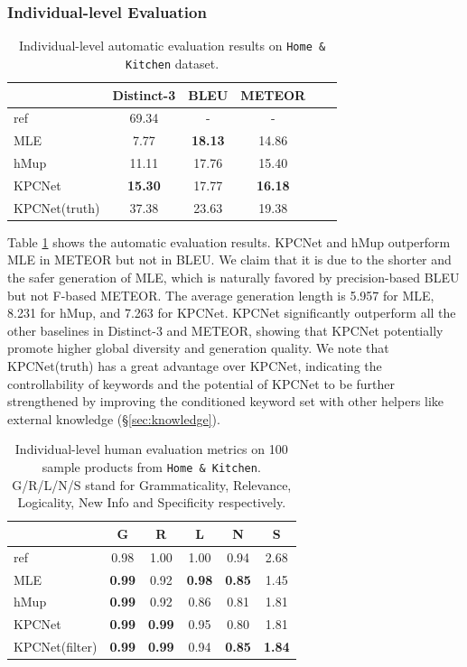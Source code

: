 \subsubsection{Individual-level Evaluation}


\begin{table}[htbp]
  \small
  \centering
  \begin{tabular}{l|ccccc}
  \hline
  {} & Distinct-3 & BLEU & METEOR \\
  \hline
  ref  &        69.34 &        - &    - \\
  \hline
  MLE &        7.77 &  \textbf{18.13} & 14.86 \\
  hMup &        11.11 &  17.76 &    15.40  \\
  KPCNet &        \textbf{15.30} &     17.77 &    \textbf{16.18}  \\
  \hline
  KPCNet(truth) &        37.38 &     23.63 &    19.38  \\
  \hline
  \end{tabular}
  \caption{\label{tab:ind-auto-eval} Individual-level automatic evaluation results on \texttt{Home \& Kitchen} dataset.}
\end{table}

Table \ref{tab:ind-auto-eval} shows the automatic evaluation results. KPCNet and hMup outperform MLE in METEOR but not in BLEU. We claim that it is due to the shorter and the safer generation of MLE, which is naturally favored by precision-based BLEU but not F-based METEOR. The average generation length is 5.957 for MLE, 8.231 for hMup, and 7.263 for KPCNet. KPCNet significantly outperform all the other baselines in Distinct-3 and METEOR, showing that KPCNet potentially promote higher global diversity and generation quality. We note that KPCNet(truth) has a great advantage over KPCNet, indicating the controllability of keywords and the potential of KPCNet to be further strengthened by improving the conditioned keyword set with other helpers like external knowledge (\S \ref{sec:knowledge}).


\begin{table}[htbp]
  \small
  \centering
  \begin{tabular}{l|ccccc}
  \hline
  {} & G & R & L & N & S \\
  \hline
  ref  &        0.98 &        1.00 &    1.00 &     0.94 &     2.68 \\
  \hline
  MLE  &        \textbf{0.99} &     0.92 &    \textbf{0.98} &     \textbf{0.85} &     1.45 \\
  hMup &        \textbf{0.99} &     0.92 &    0.86 &     0.81 &     1.81 \\
  KPCNet &        \textbf{0.99} &     \textbf{0.99} &    0.95 &     0.80 &     1.81 \\
  KPCNet(filter) &        \textbf{0.99} &     \textbf{0.99} &    0.94 &     \textbf{0.85} &     \textbf{1.84} \\
  \hline
  \end{tabular}
  \caption{\label{tab:ind-human-eval} Individual-level human evaluation metrics on 100 sample products from \texttt{Home \& Kitchen}. G/R/L/N/S stand for Grammaticality, Relevance, Logicality, New Info and Specificity respectively.}
\end{table}


